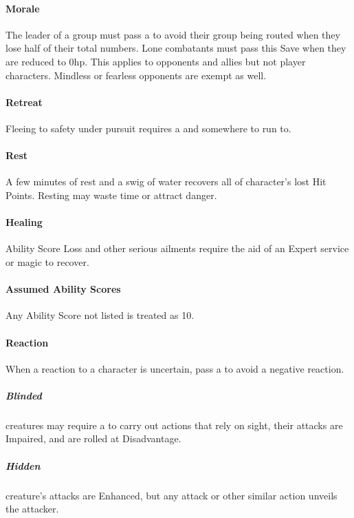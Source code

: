\documentclass[itdr]{subfiles}
\begin{document}
\paragraph{Morale}
The leader of a group must pass a  to avoid their group being routed when they lose half of their total numbers. Lone combatants must pass this Save when they are reduced to 0hp. This applies to opponents and allies but not player characters. Mindless or fearless opponents are exempt as well.

\paragraph{Retreat}
Fleeing to safety under pursuit requires a  and somewhere to run to.

\paragraph{Rest}
A few minutes of rest and a swig of water recovers all of character's lost Hit Points. Resting may waste time or attract danger.

\paragraph{Healing}
Ability Score Loss and other serious ailments require the aid of an Expert service or magic to recover.

\paragraph{Assumed Ability Scores}
Any Ability Score not listed is treated as 10.

\paragraph{Reaction}
When a reaction to a character is uncertain, pass a  to avoid a negative reaction.


\subparagraph{Blinded} creatures may require a  to carry out actions that rely on sight, their attacks are Impaired, and  are rolled at Disadvantage.

\subparagraph{Hidden} creature's attacks are Enhanced, but any attack or other similar action unveils the attacker.
\end{document}
